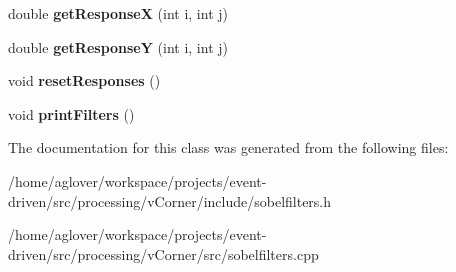 \begin{DoxyCompactItemize}
\item 
double {\bfseries get\+ResponseX} (int i, int j)\hypertarget{classsobelfilter_ad16e41ebabe6d6bfa649f2ddcc7eedaf}{}\label{classsobelfilter_ad16e41ebabe6d6bfa649f2ddcc7eedaf}

\item 
double {\bfseries get\+ResponseY} (int i, int j)\hypertarget{classsobelfilter_aade7471ca1a66a49550108a7a75000f7}{}\label{classsobelfilter_aade7471ca1a66a49550108a7a75000f7}

\item 
void {\bfseries reset\+Responses} ()\hypertarget{classsobelfilter_a38ae108ab78e789c66f1d6a2c75477a9}{}\label{classsobelfilter_a38ae108ab78e789c66f1d6a2c75477a9}

\item 
void {\bfseries print\+Filters} ()\hypertarget{classsobelfilter_a2ca8b60b9749b1d05e58788d946726da}{}\label{classsobelfilter_a2ca8b60b9749b1d05e58788d946726da}

\end{DoxyCompactItemize}


The documentation for this class was generated from the following files\+:\begin{DoxyCompactItemize}
\item 
/home/aglover/workspace/projects/event-\/driven/src/processing/v\+Corner/include/sobelfilters.\+h\item 
/home/aglover/workspace/projects/event-\/driven/src/processing/v\+Corner/src/sobelfilters.\+cpp\end{DoxyCompactItemize}
